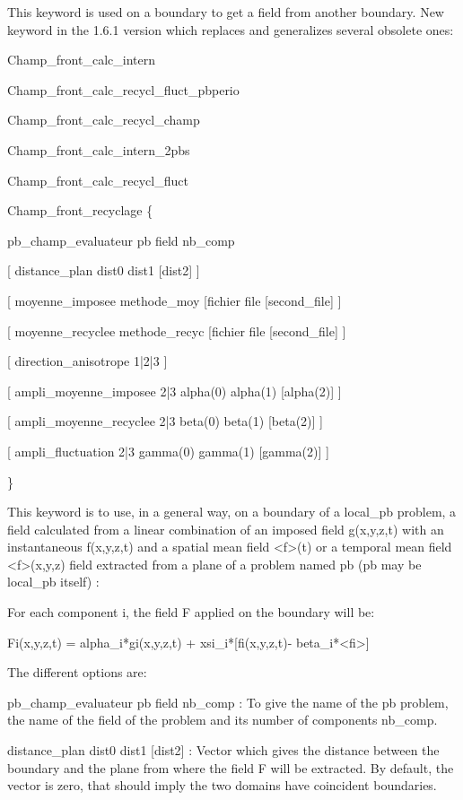  This keyword is used on a boundary to get a field from another boundary. New keyword in the 1.6.1 version which replaces and generalizes several obsolete ones:

Champ\_front\_calc\_intern

Champ\_front\_calc\_recycl\_fluct\_pbperio

Champ\_front\_calc\_recycl\_champ

Champ\_front\_calc\_intern\_2pbs

Champ\_front\_calc\_recycl\_fluct



Champ\_front\_recyclage \{

    pb\_champ\_evaluateur pb field nb\_comp

    [ distance\_plan dist0 dist1 [dist2] ]

    [ moyenne\_imposee methode\_moy [fichier file [second\_file] ]

    [ moyenne\_recyclee methode\_recyc [fichier file [second\_file] ]

    [ direction\_anisotrope 1|2|3 ]

    [ ampli\_moyenne\_imposee 2|3 alpha(0) alpha(1) [alpha(2)] ]

    [ ampli\_moyenne\_recyclee 2|3 beta(0) beta(1) [beta(2)] ]

    [ ampli\_fluctuation 2|3 gamma(0) gamma(1) [gamma(2)] ]

\}



This keyword is to use, in a general way, on a boundary of a local\_pb problem, a field calculated from a linear combination of an imposed field g(x,y,z,t) with an instantaneous f(x,y,z,t) and a spatial mean field <f>(t) or a temporal mean field <f>(x,y,z) field extracted from a plane of a problem named pb (pb may be local\_pb itself) :



For each component i, the field F applied on the boundary will be:



Fi(x,y,z,t) = alpha\_i*gi(x,y,z,t)  + xsi\_i*[fi(x,y,z,t)- beta\_i*<fi>]



The different options are:

pb\_champ\_evaluateur pb field nb\_comp : To give the name of the pb problem, the name of the field of the problem and its number of components nb\_comp.



distance\_plan dist0 dist1 [dist2] : Vector which gives the distance between the boundary and the plane from where the field F will be extracted. By default, the vector is zero, that should imply the two domains have coincident boundaries.



